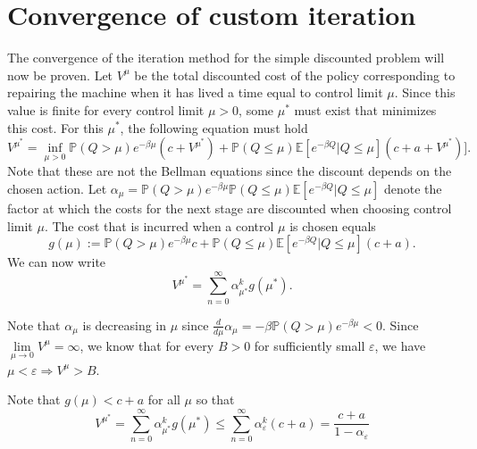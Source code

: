 \section{Convergence of custom iteration}
The convergence of the iteration method for the simple discounted problem will now be proven.
Let $V^\mu$ be the total discounted cost of the policy corresponding to repairing the machine when it has lived a time equal to control limit $\mu$.
Since this value is finite for every control limit $\mu>0$, some $\mu^*$ must exist that minimizes this cost.
For this $\mu^*$, the following equation must hold
\begin{equation}\label{eq:notBellman}
V^{\mu^*}=\inf\limits_{\mu>0}\mathbb{P}(Q>\mu)e^{-\beta \mu}(c+V^{\mu^*})+\mathbb{P}(Q\leq \mu)\mathbb{E}[e^{-\beta Q}|Q\leq \mu](c+a+V^{\mu^*})]. 
\end{equation}
Note that these are not the Bellman equations since the discount depends on the chosen action.
Let $\alpha_\mu=\mathbb{P}(Q>\mu)e^{-\beta \mu} \mathbb{P}(Q\leq \mu)\mathbb{E}[e^{-\beta Q}|Q\leq \mu]$ denote the factor at which the costs for the next stage are discounted when choosing control limit $\mu$.
The cost that is incurred when a control $\mu$ is chosen equals
$$
g(\mu):=\mathbb{P}(Q>\mu)e^{-\beta \mu}c+\mathbb{P}(Q\leq \mu)\mathbb{E}[e^{-\beta Q}|Q\leq \mu](c+a).
$$
We can now write
$$
V^{\mu^*}=\sum\limits_{n=0}^\infty \alpha_{\mu^*}^kg(\mu^*).
$$

Note that $\alpha_\mu$ is decreasing in $\mu$ since $\frac{d}{d\mu}\alpha_\mu=-\beta\mathbb{P}(Q>\mu)e^{-\beta \mu}<0$.
Since $\lim\limits_{\mu\rightarrow 0}V^{\mu}=\infty$, we know that for every $B>0$ for sufficiently small $\varepsilon$, we have $\mu<\varepsilon\Rightarrow V^{\mu}>B$.

Note that $g(\mu)<c+a$ for all $\mu$ so that 
$$
V^{\mu^*}=\sum\limits_{n=0}^\infty \alpha_{\mu^*}^kg(\mu^*)\leq \sum\limits_{n=0}^\infty \alpha_\varepsilon^k(c+a)=\frac{c+a}{1-\alpha_\varepsilon}
$$

